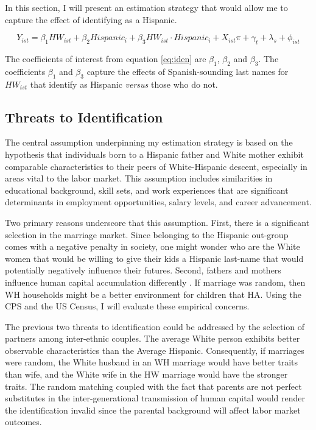 \documentclass[12pt,english]{article}
\begin{document}
In this section, I will present an estimation strategy that would allow me to capture the effect of identifying as a Hispanic. 

\begin{equation} \label{eq:iden}
Y_{ist} = \beta_{1} HW_{ist} + \beta_{2} Hispanic_i + \beta_{3} HW_{ist} \cdot Hispanic_i + X_{ist} \pi + \gamma_{t} + \lambda_s + \phi_{ist}
\end{equation}

The coefficients of interest from equation \ref{eq:iden} are $\beta_{1}$, $\beta_{2}$ and $\beta_{3}$. The coefficients $\beta_{1}$ and $\beta_{3}$ capture the effects of Spanish-sounding last names for $HW_{ist}$ that identify as Hispanic \textit{versus} those who do not.

\subsection{Threats to Identification}

The central assumption underpinning my estimation strategy is based on the hypothesis that individuals born to a Hispanic father and White mother exhibit comparable characteristics to their peers of White-Hispanic descent, especially in areas vital to the labor market. This assumption includes similarities in educational background, skill sets, and work experiences that are significant determinants in employment opportunities, salary levels, and career advancement. 

Two primary reasons underscore that this assumption. First, there is a significant selection in the marriage market. Since belonging to the Hispanic out-group comes with a negative penalty in society, one might wonder who are the White women that would be willing to give their kids a Hispanic last-name that would potentially negatively influence their futures. Second, fathers and mothers influence human capital accumulation differently \autocite{kimball2009risk,magruder2010intergenerational}. If marriage was random, then WH households might be a better environment for children that HA. Using the CPS and the US Census, I will evaluate these empirical concerns. 

The previous two threats to identification could be addressed by the selection of partners among inter-ethnic couples. The average White person exhibits better observable characteristics than the Average Hispanic. Consequently, if marriages were random, the White husband in an WH marriage would have better traits than wife, and the White wife in the HW marriage would have the stronger traits. The random matching coupled with the fact that parents are not perfect substitutes in the inter-generational transmission of human capital would render the identification invalid since the parental background will affect labor market outcomes. 
\end{document}
